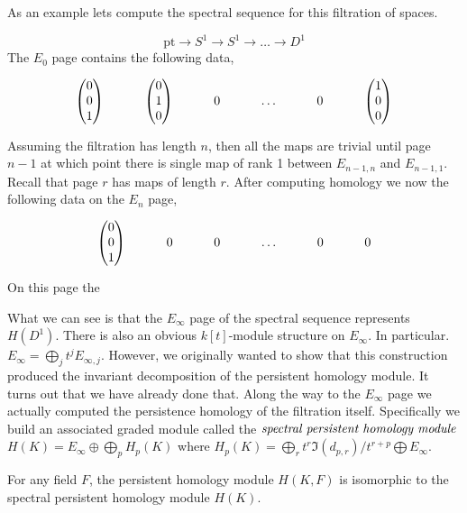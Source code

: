 As an example lets compute the spectral sequence for this filtration of spaces.
\begin{example}
\[ \textrm{pt} \rightarrow S^1 \rightarrow S^1 \rightarrow \ldots \rightarrow D^1 \] 
The $E_0$ page contains the following data,
\[ \begin{tikzcd}
\begin{pmatrix}
0 \\
0 \\
1 \\
\end{pmatrix} & 
\begin{pmatrix}
0 \\ 
1 \\ 
0
\end{pmatrix} & 0 & \ldots & 0 & 
\begin{pmatrix} 
1 \\ 
0 \\ 
0 
\end{pmatrix}
\end{tikzcd} \]
Assuming the filtration has length $n$, then all the maps are trivial until page $n-1$ at which point there is single map of rank 1 between $E_{{n-1},n}$ and $E_{{n-1},1}$.
Recall that page $r$ has maps of length $r$. After computing homology we now the following data on the $E_n$ page,
\[ \begin{tikzcd}
\begin{pmatrix}
0 \\
0 \\
1 \\
\end{pmatrix} & 0 & 0 & \ldots & 0 & 0
\end{tikzcd} \]
On this page the 
\end{example}
What we can see is that the $E_\infty$ page of the spectral sequence represents $H(D^1)$. There is also an obvious $k[t]$-module structure on $E_\infty$. In particular. $E_\infty = \bigoplus_j t^j E_{\infty,j}$. However, we originally wanted to show that this construction produced the invariant decomposition of the persistent homology module. It turns out that we have already done that. Along the way to the $E_\infty$ page we actually computed the persistence homology of the filtration itself. Specifically we build an associated graded module called the $\emph{spectral persistent homology module}$ $H(K) = E_\infty \oplus \bigoplus_p H_p(K)$ where $H_p(K) = \bigoplus_r t^r \Im(d_{p,r}) / t^{r+p} \bigoplus E_\infty$.
\begin{theorem}
For any field $F$, the persistent homology module $H(K,F)$ is isomorphic to the spectral persistent homology module $H(K)$.
\end{theorem}
